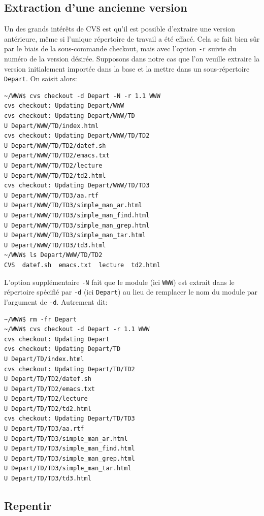 \documentclass[11pt,a4paper]{article}
\begin{document}
\subsection{Extraction d'une ancienne version}

Un des grands intérêts de CVS est qu'il est possible d'extraire une
version antérieure, même si l'unique répertoire de travail a été
effacé. Cela se fait bien sûr par le biais de la sous-commande
\textsf{checkout}, mais avec l'option \texttt{-r} suivie du numéro de
la version désirée. Supposons dans notre cas que l'on veuille extraire
la version initialement importée dans la base et la mettre dans un
sous-répertoire \texttt{Depart}. On saisit alors:

{\small
\begin{verbatim}
~/WWW$ cvs checkout -d Depart -N -r 1.1 WWW
cvs checkout: Updating Depart/WWW
cvs checkout: Updating Depart/WWW/TD
U Depart/WWW/TD/index.html
cvs checkout: Updating Depart/WWW/TD/TD2
U Depart/WWW/TD/TD2/datef.sh
U Depart/WWW/TD/TD2/emacs.txt
U Depart/WWW/TD/TD2/lecture
U Depart/WWW/TD/TD2/td2.html
cvs checkout: Updating Depart/WWW/TD/TD3
U Depart/WWW/TD/TD3/aa.rtf
U Depart/WWW/TD/TD3/simple_man_ar.html
U Depart/WWW/TD/TD3/simple_man_find.html
U Depart/WWW/TD/TD3/simple_man_grep.html
U Depart/WWW/TD/TD3/simple_man_tar.html
U Depart/WWW/TD/TD3/td3.html
~/WWW$ ls Depart/WWW/TD/TD2
CVS  datef.sh  emacs.txt  lecture  td2.html
\end{verbatim}
}

\noindent L'option supplémentaire \texttt{-N} fait que le module (ici
\texttt{WWW}) est extrait dans le répertoire spécifié par \texttt{-d}
(ici \texttt{Depart}) au lieu de remplacer le nom du module par
l'argument de \texttt{-d}. Autrement dit:

{\small
\begin{verbatim}
~/WWW$ rm -fr Depart
~/WWW$ cvs checkout -d Depart -r 1.1 WWW
cvs checkout: Updating Depart
cvs checkout: Updating Depart/TD
U Depart/TD/index.html
cvs checkout: Updating Depart/TD/TD2
U Depart/TD/TD2/datef.sh
U Depart/TD/TD2/emacs.txt
U Depart/TD/TD2/lecture
U Depart/TD/TD2/td2.html
cvs checkout: Updating Depart/TD/TD3
U Depart/TD/TD3/aa.rtf
U Depart/TD/TD3/simple_man_ar.html
U Depart/TD/TD3/simple_man_find.html
U Depart/TD/TD3/simple_man_grep.html
U Depart/TD/TD3/simple_man_tar.html
U Depart/TD/TD3/td3.html
\end{verbatim}
}

\subsection{Repentir}
\end{document}
